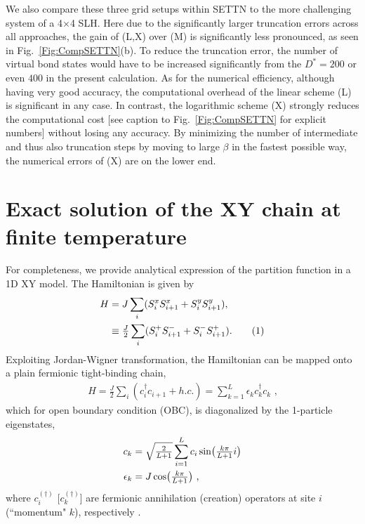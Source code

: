 \documentclass[aps,prx,twocolumn,showpacs,psfig,superscriptaddress,longbibliography]{revtex4-1}
\newcommand{\Fig}[1]{Fig.~\ref{#1}}
\def\Dstar{D^\ast}
\newcommand\numberthis{\addtocounter{equation}{1}\tag{\theequation}}
\begin{document}
We also compare these three grid setups within SETTN to the more
challenging system of a 4$\times$4 SLH.  Here
due to the significantly larger truncation errors across all
approaches, the gain of (L,X) over (M) is significantly less
pronounced, as seen in \Fig{Fig:CompSETTN}(b).  To reduce the
truncation error, the number of virtual bond states would have to be
increased significantly from the $\Dstar=200$ or even $400$ in the
present calculation.  As for the numerical efficiency, although
having very good accuracy, the computational overhead of the linear
scheme (L) is significant in any case. In contrast, the logarithmic
scheme (X) strongly reduces the computational cost [see caption to
\Fig{Fig:CompSETTN} for explicit numbers] without losing any
accuracy.  By minimizing the number of intermediate and thus also
truncation steps by moving to large $\beta$ in the fastest possible
way, the numerical errors of (X) are on the lower end.

\section{Exact solution of the XY chain at finite temperature}
\label{App:XY-Chain}

For completeness, we provide analytical expression of the partition
function in a 1D XY model. The Hamiltonian is given by
%
\begin{align*}
 H &= J\sum_i
   (S^x_i S^x_{i+1} + S^y_i S^y_{i+1}), \\
    &\equiv \tfrac{J}{2}\sum_i
    (S^+_i S^-_{i+1} + S^-_i S^+_{i+1}). \numberthis
\end{align*}
%
Exploiting Jordan-Wigner transformation, the Hamiltonian can be
mapped onto a plain  {fermionic} tight-binding chain,
%
\begin{align}
  H = \tfrac{J}{2}\sum_i (c^{\dagger}_i c_{i+1} + h.c.)
  =\sum_{k=1}^L \epsilon_k c_k^{\dagger} c_k
\text{ ,}
\end{align}
%
which for open boundary condition (OBC), is diagonalized by
the 1-particle eigenstates,
\begin{align}
c_k &= \sqrt{\tfrac{2}{L+1}}
\sum_{i=1}^L c_i \sin\bigl(\tfrac{k\pi}{L+1}i\bigr) \notag \\
\epsilon_k &= J\cos\bigl(\tfrac{k\pi}{L+1} \bigr)
\text{ ,}
\end{align}
where $c_i^{(\dagger)}$ [$c_k^{(\dagger)}$] are fermionic
annihilation (creation) operators at site $i$ (``momentum" $k$),
respectively  \cite{Tu.h:2017:Klein, UniEntropy-2017}.
\end{document}
